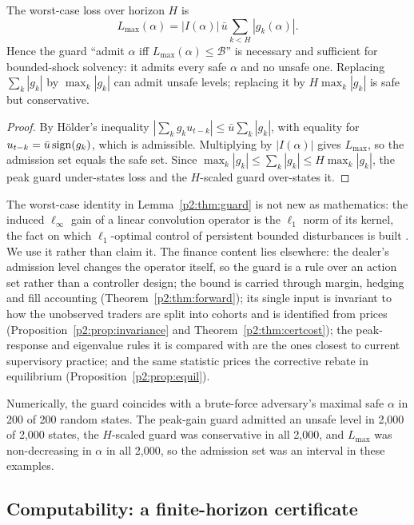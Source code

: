 \begin{lemma}\label{p2:thm:guard}
The worst-case loss over horizon $H$ is
\[
L_{\max}(\alpha)=|I(\alpha)|\,\bar u\sum_{k<H}|g_k(\alpha)|.
\]
Hence the guard ``admit $\alpha$ iff $L_{\max}(\alpha)\le\mathcal B$'' is necessary and sufficient for bounded-shock solvency: it admits every safe $\alpha$ and no unsafe one. Replacing $\sum_k|g_k|$ by $\max_k|g_k|$ can admit unsafe levels; replacing it by $H\max_k|g_k|$ is safe but conservative.
\end{lemma}

\begin{proof}
By H\"older's inequality $|\sum_kg_ku_{t-k}|\le\bar u\sum_k|g_k|$, with equality for $u_{t-k}=\bar u\,{\rm sign}(g_k)$, which is admissible. Multiplying by $|I(\alpha)|$ gives $L_{\max}$, so the admission set equals the safe set. Since $\max_k|g_k|\le\sum_k|g_k|\le H\max_k|g_k|$, the peak guard under-states loss and the $H$-scaled guard over-states it.
\end{proof}

The worst-case identity in Lemma~\ref{p2:thm:guard} is not new as mathematics: the induced $\ell_\infty$ gain of a linear convolution operator is the $\ell_1$ norm of its kernel, the fact on which $\ell_1$-optimal control of persistent bounded disturbances is built \citep{p2:vidyasagar1986,p2:dahleh1987,p2:dahleh1995}. We use it rather than claim it. The finance content lies elsewhere: the dealer's admission level changes the operator itself, so the guard is a rule over an action set rather than a controller design; the bound is carried through margin, hedging and fill accounting (Theorem~\ref{p2:thm:forward}); its single input is invariant to how the unobserved traders are split into cohorts and is identified from prices (Proposition~\ref{p2:prop:invariance} and Theorem~\ref{p2:thm:certcost}); the peak-response and eigenvalue rules it is compared with are the ones closest to current supervisory practice; and the same statistic prices the corrective rebate in equilibrium (Proposition~\ref{p2:prop:equil}).

Numerically, the guard coincides with a brute-force adversary's maximal safe $\alpha$ in 200 of 200 random states. The peak-gain guard admitted an unsafe level in 2,000 of 2,000 states, the $H$-scaled guard was conservative in all 2,000, and $L_{\max}$ was non-decreasing in $\alpha$ in all 2,000, so the admission set was an interval in these examples.

\subsection{Computability: a finite-horizon certificate}

